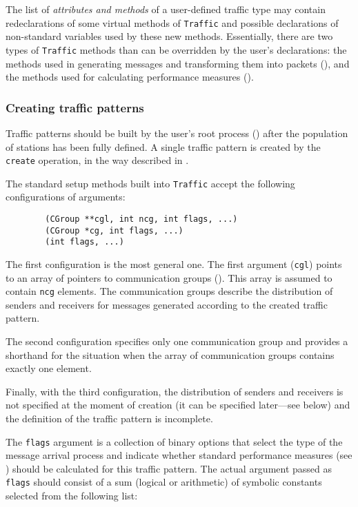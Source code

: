 The list of {\em attributes and methods\/} of a user-defined traffic type
may contain redeclarations of
some virtual methods of {\tt Traffic} and possible declarations
of non-standard variables used by these new methods.
Essentially, there are two types of {\tt Traffic} methods than can be
overridden by the user's declarations: the methods used in generating messages
and transforming them into packets (),
and the methods used for calculating performance measures ().

\subsubsection{Creating traffic patterns}
\label{rm_cl_dt_ct}

Traffic patterns should be built by the user's root process ()
after the population of stations has been fully defined.
A single traffic pattern is created by the {\tt create} operation, in the
way described in .

The standard setup methods built into {\tt Traffic} accept the following
configurations of arguments:

\begin{verbatim}
        (CGroup **cgl, int ncg, int flags, ...)
        (CGroup *cg, int flags, ...)
        (int flags, ...)
\end{verbatim}

The first configuration is the most general one.
The first argument ({\tt cgl}) points to an array of pointers to communication
groups ().
This array is assumed to contain {\tt ncg} elements.
The communication groups describe the distribution of senders and receivers
for messages generated according to the created traffic pattern.

The second configuration specifies only one communication group and provides
a shorthand for the situation when the array of communication groups
contains exactly one element.

Finally, with the third configuration, the distribution of senders and
receivers is not specified at the moment of creation (it can be specified
later---see below) and the definition of the traffic pattern is incomplete.

The {\tt flags} argument is a collection of binary options that select the type
of the message arrival process and indicate whether standard performance
measures (see ) should be calculated for this traffic pattern.
The actual argument passed as {\tt flags} should consist of a sum (logical
or arithmetic) of symbolic constants selected from the following list:


